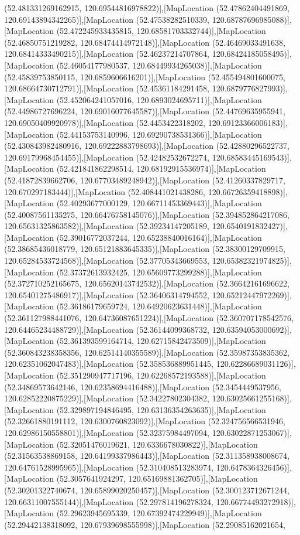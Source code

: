 (52.481331269162915, 120.69544816978822)],[MapLocation (52.47862404491869, 120.69143894342265)],[MapLocation (52.47538282510339, 120.68787696985088)],[MapLocation (52.472245933435815, 120.68581703332744)],[MapLocation (52.46850751219282, 120.68474414972148)],[MapLocation (52.46469033491638, 120.68414333490215)],[MapLocation (52.46237214707864, 120.68424185058495)],[MapLocation (52.46054177980537, 120.68449934265038)],[MapLocation (52.45839753850115, 120.6859606616201)],[MapLocation (52.455494801600075, 120.68664730712791)],[MapLocation (52.45361184291458, 120.6879776827993)],[MapLocation (52.452064241057016, 120.6893024695711)],[MapLocation (52.44986727696224, 120.69016077645587)],[MapLocation (52.44769635955941, 120.69050409920978)],[MapLocation (52.4453422318202, 120.69123366006183)],[MapLocation (52.44153753140996, 120.69290738531366)],[MapLocation (52.430843982480916, 120.69222883798693)],[MapLocation (52.42880296522737, 120.69179968454455)],[MapLocation (52.42482532672274, 120.68583445169543)],[MapLocation (52.421841862298514, 120.68192915536974)],[MapLocation (52.41872839662706, 120.67703489248942)],[MapLocation (52.41260337829717, 120.670297183444)],[MapLocation (52.408441021438286, 120.66726359418898)],[MapLocation (52.40293677000129, 120.66711453369443)],[MapLocation (52.40087561135275, 120.66476758145076)],[MapLocation (52.394852864217086, 120.65631325863582)],[MapLocation (52.39234147205189, 120.6540191832427)],[MapLocation (52.39016772037244, 120.65238840016164)],[MapLocation (52.38685436018779, 120.65121883645335)],[MapLocation (52.38300129709915, 120.65284533724568)],[MapLocation (52.37705343669553, 120.65382321974825)],[MapLocation (52.37372613932425, 120.65609773299288)],[MapLocation (52.372710252165675, 120.65620143742532)],[MapLocation (52.36642161696622, 120.65401275486917)],[MapLocation (52.36406314794552, 120.65212447972269)],[MapLocation (52.36186179659724, 120.64920623631448)],[MapLocation (52.361127988441076, 120.64736087651224)],[MapLocation (52.360707178542576, 120.64465234488729)],[MapLocation (52.36144099368732, 120.63594053000692)],[MapLocation (52.361393599164714, 120.62715842473509)],[MapLocation (52.360843238358356, 120.62514140355589)],[MapLocation (52.35987353835362, 120.62351062047483)],[MapLocation (52.358536889951445, 120.62286689031126)],[MapLocation (52.351290947717196, 120.62268572193588)],[MapLocation (52.34869573642146, 120.62358694416488)],[MapLocation (52.3454449537956, 120.62852220875229)],[MapLocation (52.34227802304382, 120.63025661255168)],[MapLocation (52.329897194846495, 120.63136354263635)],[MapLocation (52.32661880191112, 120.6300760823092)],[MapLocation (52.324756566531946, 120.62986150558801)],[MapLocation (52.32375984497094, 120.63022871253067)],[MapLocation (52.32051476019621, 120.6336678030822)],[MapLocation (52.31563538869158, 120.64199337986443)],[MapLocation (52.311358938008674, 120.64761528995965)],[MapLocation (52.310408513283974, 120.6478364326456)],[MapLocation (52.3057641924297, 120.65169881362705)],[MapLocation (52.30201322740674, 120.65899020250457)],[MapLocation (52.300123712671244, 120.66311007555144)],[MapLocation (52.297814196278324, 120.66774493272918)],[MapLocation (52.29623945695339, 120.67392474229949)],[MapLocation (52.29442138318092, 120.67939698555998)],[MapLocation (52.29085162021654, 